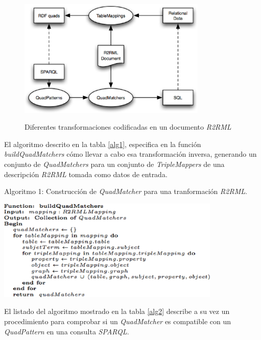 \begin{figure}
\vspace{2.4in}
\centering
\caption{Diferentes transformaciones codificadas en un documento \textit{R2RML}}
\vspace{5mm}
\includegraphics[width=0.8\textwidth]{figura2}
\label{figura2}
\end{figure}


El algoritmo descrito en la tabla \ref{alg1}, especifica en la funci\'on \textit{buildQuadMatchers} c\'omo llevar a cabo esa transformaci\'on inversa, generando un conjunto de \textit{QuadMatchers} para un conjunto de \textit{TripleMappers} de una descripci\'on \textit{R2RML} tomada como datos de entrada.\\

\begin{table}
\vspace{2.4in}
\caption{Algoritmo 1: Construcci\'on de \textit{QuadMatcher} para una tranformaci\'on \textit{R2RML}.}
\vspace{5mm}
\includegraphics[width=0.8\textwidth]{algoritmo1}
\label{alg1}
\end{table}

El listado del algoritmo mostrado en la tabla \ref{alg2} describe a su vez un procedimiento para comprobar si un \textit{QuadMatcher} es compatible con un \textit{QuadPattern} en una consulta \textit{SPARQL}.\\

